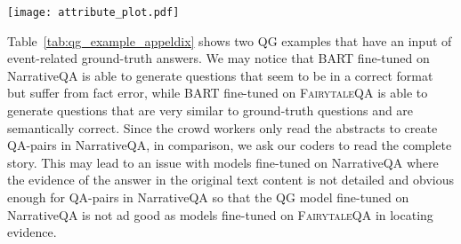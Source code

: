 \documentclass[11pt]{article}
\newcommand{\datasetname}{\textsc{FairytaleQA}\xspace}
\begin{document}




\begin{figure*}[!htb]
\centering
    
    \texttt{[image: attribute\_plot.pdf]}
    \caption{Percent of each question type by coder.}
    \label{fig:proportion_question}
    
\end{figure*}



Table~\ref{tab:qg_example_appeldix} shows two QG examples that have an input of event-related ground-truth answers. We may notice that BART fine-tuned on NarrativeQA is able to generate questions that seem to be in a correct format but suffer from fact error, while BART fine-tuned on \datasetname is able to generate questions that are very similar to ground-truth questions and are semantically correct. Since the crowd workers only read the abstracts to create QA-pairs in NarrativeQA, in comparison, we ask our coders to read the complete story. This may lead to an issue with models fine-tuned on NarrativeQA where the evidence of the answer in the original text content is not detailed and obvious enough for QA-pairs in NarrativeQA so that the QG model fine-tuned on NarrativeQA is not ad good as models fine-tuned on \datasetname in locating evidence. 
\end{document}
